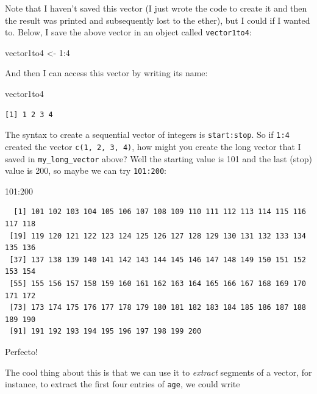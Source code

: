 \documentclass[
  letterpaper,
  DIV=11,
  numbers=noendperiod]{scrreprt}
\newenvironment{Shaded}{\begin{snugshade}}{\end{snugshade}}
\newcommand{\DecValTok}[1]{\textcolor[rgb]{0.68,0.00,0.00}{#1}}
\newcommand{\NormalTok}[1]{\textcolor[rgb]{0.00,0.23,0.31}{#1}}
\newcommand{\OtherTok}[1]{\textcolor[rgb]{0.00,0.23,0.31}{#1}}
\newcommand{\SpecialCharTok}[1]{\textcolor[rgb]{0.37,0.37,0.37}{#1}}
\begin{document}
Note that I haven't saved this vector (I just wrote the code to create
it and then the result was printed and subsequently lost to the ether),
but I could if I wanted to. Below, I save the above vector in an object
called \texttt{vector1to4}:

\begin{Shaded}
\begin{Highlighting}[]
\NormalTok{vector1to4 }\OtherTok{\textless{}{-}} \DecValTok{1}\SpecialCharTok{:}\DecValTok{4}
\end{Highlighting}
\end{Shaded}

And then I can access this vector by writing its name:

\begin{Shaded}
\begin{Highlighting}[]
\NormalTok{vector1to4}
\end{Highlighting}
\end{Shaded}

\begin{verbatim}
[1] 1 2 3 4
\end{verbatim}

The syntax to create a sequential vector of integers is
\texttt{start:stop}. So if \texttt{1:4} created the vector
\texttt{c(1,\ 2,\ 3,\ 4)}, how might you create the long vector that I
saved in \texttt{my\_long\_vector} above? Well the starting value is 101
and the last (stop) value is 200, so maybe we can try \texttt{101:200}:

\begin{Shaded}
\begin{Highlighting}[]
\DecValTok{101}\SpecialCharTok{:}\DecValTok{200}
\end{Highlighting}
\end{Shaded}

\begin{verbatim}
  [1] 101 102 103 104 105 106 107 108 109 110 111 112 113 114 115 116 117 118
 [19] 119 120 121 122 123 124 125 126 127 128 129 130 131 132 133 134 135 136
 [37] 137 138 139 140 141 142 143 144 145 146 147 148 149 150 151 152 153 154
 [55] 155 156 157 158 159 160 161 162 163 164 165 166 167 168 169 170 171 172
 [73] 173 174 175 176 177 178 179 180 181 182 183 184 185 186 187 188 189 190
 [91] 191 192 193 194 195 196 197 198 199 200
\end{verbatim}

Perfecto!

The cool thing about this is that we can use it to \emph{extract}
segments of a vector, for instance, to extract the first four entries of
\texttt{age}, we could write
\end{document}
